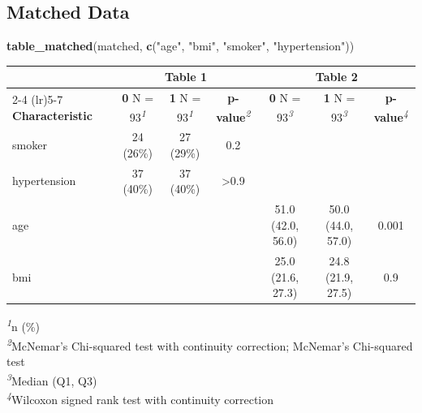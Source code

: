 \documentclass[
]{article}
\newenvironment{Shaded}{\begin{snugshade}}{\end{snugshade}}
\newcommand{\FunctionTok}[1]{\textcolor[rgb]{0.13,0.29,0.53}{\textbf{#1}}}
\newcommand{\NormalTok}[1]{#1}
\newcommand{\StringTok}[1]{\textcolor[rgb]{0.31,0.60,0.02}{#1}}
\begin{document}
\subsection{Matched Data}\label{matched-data}

\begin{Shaded}
\begin{Highlighting}[]
\FunctionTok{table\_matched}\NormalTok{(matched, }\FunctionTok{c}\NormalTok{(}\StringTok{"age"}\NormalTok{, }\StringTok{"bmi"}\NormalTok{, }\StringTok{"smoker"}\NormalTok{, }\StringTok{"hypertension"}\NormalTok{))}
\end{Highlighting}
\end{Shaded}

\begin{table}[t]
\fontsize{12.0pt}{14.0pt}\selectfont
\begin{tabular*}{\linewidth}{@{\extracolsep{\fill}}lcccccc}
\toprule
 & \multicolumn{3}{c}{{\textbf{Table 1}}} & \multicolumn{3}{c}{{\textbf{Table 2}}} \\ 
\cmidrule(lr){2-4} \cmidrule(lr){5-7}
\textbf{Characteristic} & \textbf{0}  N = 93\textsuperscript{\textit{1}} & \textbf{1}  N = 93\textsuperscript{\textit{1}} & \textbf{p-value}\textsuperscript{\textit{2}} & \textbf{0}  N = 93\textsuperscript{\textit{3}} & \textbf{1}  N = 93\textsuperscript{\textit{3}} & \textbf{p-value}\textsuperscript{\textit{4}} \\ 
\midrule\addlinespace[2.5pt]
smoker & 24 (26\%) & 27 (29\%) & 0.2 &  &  &  \\ 
hypertension & 37 (40\%) & 37 (40\%) & >0.9 &  &  &  \\ 
age &  &  &  & 51.0 (42.0, 56.0) & 50.0 (44.0, 57.0) & 0.001 \\ 
bmi &  &  &  & 25.0 (21.6, 27.3) & 24.8 (21.9, 27.5) & 0.9 \\ 
\bottomrule
\end{tabular*}
\begin{minipage}{\linewidth}
\vspace{.05em}
\textsuperscript{\textit{1}}n (\%)\\
\textsuperscript{\textit{2}}McNemar's Chi-squared test with continuity correction; McNemar's Chi-squared test\\
\textsuperscript{\textit{3}}Median (Q1, Q3)\\
\textsuperscript{\textit{4}}Wilcoxon signed rank test with continuity correction\\
\end{minipage}
\end{table}
\end{document}
